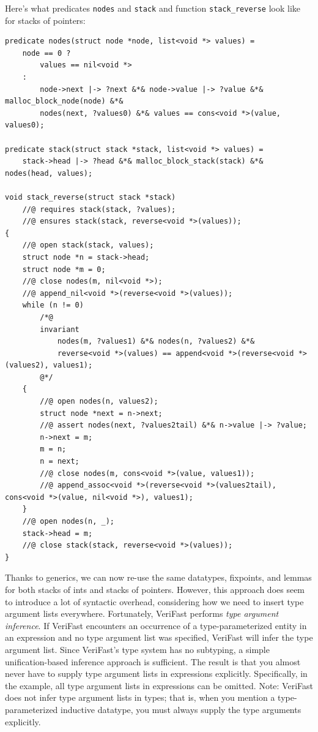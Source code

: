 \documentclass{article}
\begin{document}
Here's what predicates \lstinline!nodes! and \lstinline!stack!
and function \lstinline!stack_reverse! look like for stacks of
pointers:
\begin{lstlisting}
predicate nodes(struct node *node, list<void *> values) =
    node == 0 ?
        values == nil<void *>
    :
        node->next |-> ?next &*& node->value |-> ?value &*& malloc_block_node(node) &*&
        nodes(next, ?values0) &*& values == cons<void *>(value, values0);

predicate stack(struct stack *stack, list<void *> values) =
    stack->head |-> ?head &*& malloc_block_stack(stack) &*& nodes(head, values);

void stack_reverse(struct stack *stack)
    //@ requires stack(stack, ?values);
    //@ ensures stack(stack, reverse<void *>(values));
{
    //@ open stack(stack, values);
    struct node *n = stack->head;
    struct node *m = 0;
    //@ close nodes(m, nil<void *>);
    //@ append_nil<void *>(reverse<void *>(values));
    while (n != 0)
        /*@
        invariant
            nodes(m, ?values1) &*& nodes(n, ?values2) &*&
            reverse<void *>(values) == append<void *>(reverse<void *>(values2), values1);
        @*/
    {
        //@ open nodes(n, values2);
        struct node *next = n->next;
        //@ assert nodes(next, ?values2tail) &*& n->value |-> ?value;
        n->next = m;
        m = n;
        n = next;
        //@ close nodes(m, cons<void *>(value, values1));
        //@ append_assoc<void *>(reverse<void *>(values2tail), cons<void *>(value, nil<void *>), values1);
    }
    //@ open nodes(n, _);
    stack->head = m;
    //@ close stack(stack, reverse<void *>(values));
}
\end{lstlisting}

Thanks to generics, we can now re-use the same datatypes,
fixpoints, and lemmas for both stacks of ints and stacks of
pointers. However, this approach does seem to introduce a lot
of syntactic overhead, considering how we need to insert type
argument lists everywhere. Fortunately, VeriFast performs
\emph{type argument inference}. If VeriFast encounters an
occurrence of a type-parameterized entity in an expression and
no type argument list was specified, VeriFast will infer the
type argument list. Since VeriFast's type system has no
subtyping, a simple unification-based inference approach is
sufficient. The result is that you almost never have to supply
type argument lists in expressions explicitly. Specifically, in
the example, all type argument lists in expressions can be
omitted. Note: VeriFast does not infer type argument lists in
types; that is, when you mention a type-parameterized inductive
datatype, you must always supply the type arguments explicitly.
\end{document}
